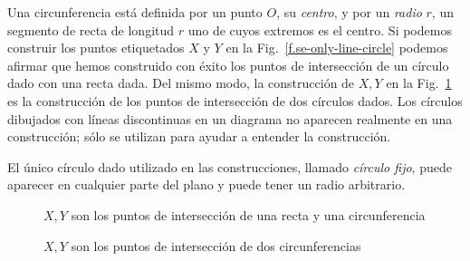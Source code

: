 {Una circunferencia está definida por un punto $O$, su \emph{centro}, y por un \emph{radio} $r$, un segmento de recta de longitud $r$ uno de cuyos extremos es el centro. Si podemos construir los puntos etiquetados $X$ y $Y$ en la Fig.~\ref{f.se-only-line-circle} podemos afirmar que hemos construido con éxito los puntos de intersección de un círculo dado con una recta dada. Del mismo modo, la construcción de $X,Y$ en la Fig.~\ref{f.se-only-two-circles} es la construcción de los puntos de intersección de dos círculos dados. Los círculos dibujados con líneas discontinuas en un diagrama no aparecen realmente en una construcción; sólo se utilizan para ayudar a entender la construcción.

El único círculo dado utilizado en las construcciones, llamado \emph{círculo fijo}, puede aparecer en cualquier parte del plano y puede tener un radio arbitrario.

\begin{figure}[t]
\begin{minipage}{.45\textwidth}
\begin{center}
\caption{$X,Y$ son los puntos de intersección de una recta y una circunferencia}\label{f.se-only-line-circle}
\end{center}
\end{minipage}
\hfill
\begin{minipage}{.45\textwidth}
\begin{center}
\caption{$X,Y$ son los puntos de intersección de dos circunferencias}\label{f.se-only-two-circles}
\end{center}
\end{minipage}
\end{figure}

}
